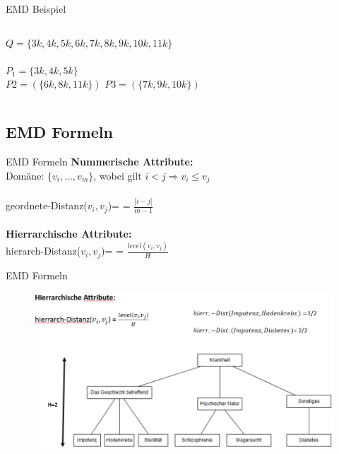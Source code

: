 \begin{frame} {EMD Beispiel}
\begin{columns}[T]
		\begin{column}{0.5\textwidth}
			$Q = \{3k, 4k, 5k, 6k, 7k, 8k, 9k, 10k, 11k\}$\\
			\ \\
			$P_1 = \{3k, 4k, 5k\}$ \\
			$P2 = (\{6k, 8k, 11k\})$ 
			$P3 = (\{7k, 9k, 10k\})$
			
		\end{column}
	\end{columns}
\end{frame}
\subsection{EMD Formeln} 
\begin{frame}{EMD Formeln}
	\textbf{Nummerische Attribute:} \\
	Domäne: $\{v_i,...,v_m\}$, wobei gilt $i<j \Rightarrow v_i \le v_j$\\
	\ \\
	geordnete-Distanz($v_i,v_j$)= = $\frac{|i-j|}{m-1}$
	\ \\
	\ \\
	\textbf{Hierrarchische Attribute:} \\
	hierarch-Distanz($v_i,v_j$)= = $\frac{level(v_i,v_j)}{H}$
\end{frame}
\begin{frame}{EMD Formeln}
	\begin{figure}
		\includegraphics[scale=0.45]{pic/EMD_Formel.png}
	\end{figure}
\end{frame}
